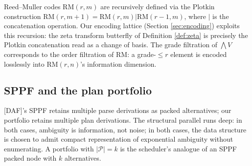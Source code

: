 Reed--Muller codes $\mathrm{RM}(r, m)$ are
recursively defined via the Plotkin construction
$\mathrm{RM}(r, m+1) = \mathrm{RM}(r, m) |
\mathrm{RM}(r-1, m)$, where $|$ is the
concatenation operation. Our encoding lattice
(Section \ref{sec:encoding}) exploits this
recursion: the zeta transform butterfly of
Definition \ref{def:zeta} is precisely the
Plotkin concatenation read as a change of basis.
The grade filtration of $\bigwedge V$ corresponds
to the order filtration of RM: a grade-$\leq r$
element is encoded losslessly into
$\mathrm{RM}(r, n)$'s information dimension.

\subsection{SPPF and the plan portfolio}

[DAF]'s SPPF retains multiple parse derivations as
packed alternatives; our portfolio retains multiple
plan derivations. The structural parallel runs
deep: in both cases, ambiguity is information, not
noise; in both cases, the data structure is
chosen to admit compact representation of
exponential ambiguity without enumerating. A
portfolio with $|\mathcal{P}| = k$ is the
scheduler's analogue of an SPPF packed node with
$k$ alternatives.
